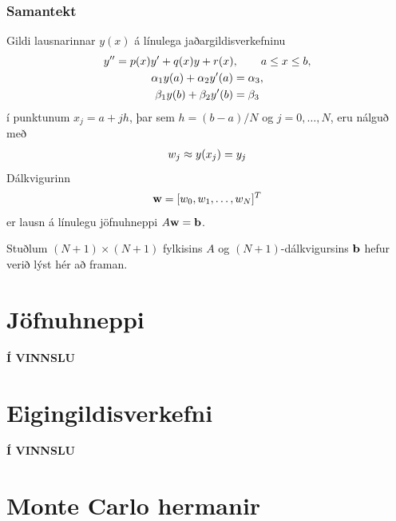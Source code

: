 \documentclass[letterpaper,10pt,icelandic]{sphinxmanual}
\begin{document}
\subsection{Samantekt}
\label{kafli07:index-5}\label{kafli07:samantekt}
Gildi lausnarinnar \(y(x)\) á línulega jaðargildisverkefninu
\begin{gather}
\begin{split}\begin{gathered}
    y''=p(x)y'+q(x)y+r(x), \qquad a\leq x\leq b,\\
\alpha_1y(a)+\alpha_2 y'(a)=\alpha_3,\\
\beta_1 y(b)+\beta_2y'(b)=\beta_3
  \end{gathered}\end{split}\notag
\end{gather}
í punktunum \(x_j=a+jh\), þar sem \(h=(b-a)/N\) og
\(j=0,\dots,N\), eru nálguð með
\begin{gather}
\begin{split}w_j\approx y(x_j)=y_j\end{split}\notag
\end{gather}
Dálkvigurinn
\begin{gather}
\begin{split}{\mbox{${\bf w}$}}=[w_0,w_1,\dots,w_N]^T\end{split}\notag
\end{gather}
er lausn á línulegu jöfnuhneppi
\(A{\mbox{${\bf w}$}}={\mbox{${\bf b}$}}\).

Stuðlum \((N+1)\times(N+1)\) fylkisins \(A\) og
\((N+1)\)-dálkvigursins \({\mbox{${\bf b}$}}\) hefur verið lýst
hér að framan.


\chapter{Jöfnuhneppi}
\label{kafli08::doc}\label{kafli08:jofnuhneppi}

\textbf{Í VINNSLU}


\chapter{Eigingildisverkefni}
\label{kafli09:eigingildisverkefni}\label{kafli09::doc}

\textbf{Í VINNSLU}


\chapter{Monte Carlo hermanir}
\label{kafli10::doc}\label{kafli10:monte-carlo-hermanir}
\end{document}
